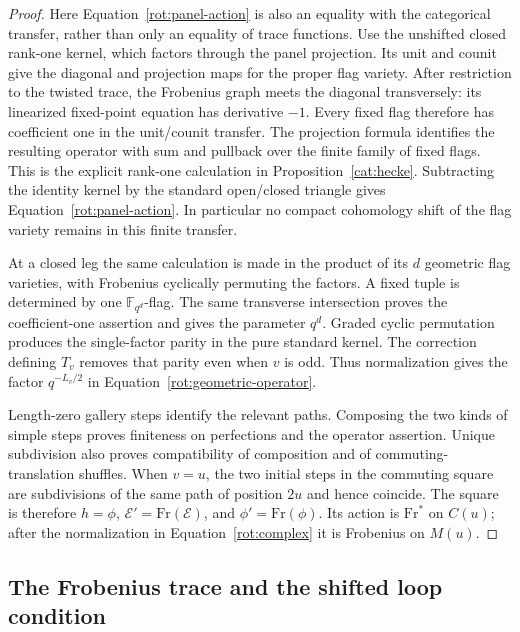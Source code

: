 \begin{proof}
Here Equation~\eqref{rot:panel-action} is also an equality with the
categorical transfer, rather than only an equality of trace functions.
Use the unshifted closed rank-one kernel, which factors through the
panel projection.  Its unit and counit give the diagonal and projection
maps for the proper flag variety.  After restriction to the twisted
trace, the Frobenius graph meets the diagonal transversely: its
linearized fixed-point equation has derivative $-1$.  Every fixed flag
therefore has coefficient one in the unit/counit transfer.  The
projection formula identifies the resulting operator with sum and
pullback over the finite family of fixed flags.  This is the explicit
rank-one calculation in Proposition~\ref{cat:hecke}.  Subtracting the
identity kernel by the standard open/closed triangle gives
Equation~\eqref{rot:panel-action}.  In particular no compact cohomology
shift of the flag variety remains in this finite transfer.

At a closed leg the same calculation is made in the product of its
$d$ geometric flag varieties, with Frobenius cyclically permuting the
factors.  A fixed tuple is determined by one
$\mathbb F_{q^d}$-flag.  The same transverse intersection proves the
coefficient-one assertion and gives the parameter $q^d$.
Graded cyclic permutation produces the single-factor parity in the
pure standard kernel.  The correction defining $T_v$ removes that
parity even when $v$ is odd.  Thus normalization gives the factor
$q^{-L_v/2}$ in Equation~\eqref{rot:geometric-operator}.

Length-zero gallery steps identify the relevant paths.  Composing the
two kinds of simple steps proves finiteness on perfections and the
operator assertion.  Unique subdivision also proves compatibility of
composition and of commuting-translation shuffles.  When $v=u$, the
two initial steps in the commuting square are subdivisions of the same
path of position $2u$ and hence coincide.  The square is therefore
$h=\phi$, $\mathcal E'=\mathrm{Fr}(\mathcal E)$, and
$\phi'=\mathrm{Fr}(\phi)$.  Its action is $\mathrm{Fr}^*$ on $C(u)$;
after the normalization in Equation~\eqref{rot:complex} it is
Frobenius on $M(u)$.
\end{proof}

\subsection{The Frobenius trace and the shifted loop condition}

